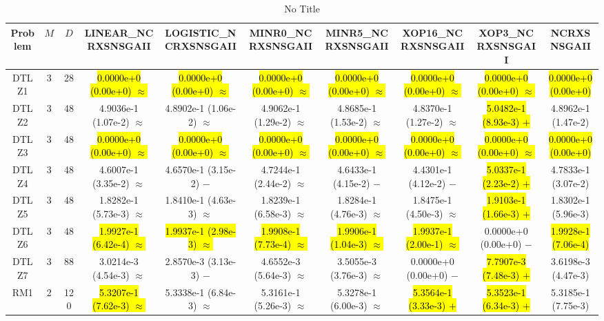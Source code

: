 \documentclass[journal]{IEEEtran}
\begin{document}
\begin{table*}[htbp]
\renewcommand{\arraystretch}{1.2}
\centering
\caption{No Title}
\begin{tabular}{cccccccccc}
\toprule
Problem&$M$&$D$&LINEAR\_NCRXSNSGAII&LOGISTIC\_NCRXSNSGAII&MINR0\_NCRXSNSGAII&MINR5\_NCRXSNSGAII&XOP16\_NCRXSNSGAII&XOP3\_NCRXSNSGAII&NCRXSNSGAII\\
\midrule
\multirow{1}{*}{DTLZ1}&3&28&\hl{0.0000e+0 (0.00e+0) $\approx$}&\hl{0.0000e+0 (0.00e+0) $\approx$}&\hl{0.0000e+0 (0.00e+0) $\approx$}&\hl{0.0000e+0 (0.00e+0) $\approx$}&\hl{0.0000e+0 (0.00e+0) $\approx$}&\hl{0.0000e+0 (0.00e+0) $\approx$}&\hl{0.0000e+0 (0.00e+0)}\\
\hline
\multirow{1}{*}{DTLZ2}&3&48&4.9036e-1 (1.07e-2) $\approx$&4.8902e-1 (1.06e-2) $\approx$&4.9062e-1 (1.29e-2) $\approx$&4.8685e-1 (1.53e-2) $\approx$&4.8370e-1 (1.27e-2) $\approx$&\hl{5.0482e-1 (8.93e-3) $+$}&4.8962e-1 (1.47e-2)\\
\hline
\multirow{1}{*}{DTLZ3}&3&48&\hl{0.0000e+0 (0.00e+0) $\approx$}&\hl{0.0000e+0 (0.00e+0) $\approx$}&\hl{0.0000e+0 (0.00e+0) $\approx$}&\hl{0.0000e+0 (0.00e+0) $\approx$}&\hl{0.0000e+0 (0.00e+0) $\approx$}&\hl{0.0000e+0 (0.00e+0) $\approx$}&\hl{0.0000e+0 (0.00e+0)}\\
\hline
\multirow{1}{*}{DTLZ4}&3&48&4.6007e-1 (3.35e-2) $\approx$&4.6570e-1 (3.15e-2) $-$&4.7244e-1 (2.44e-2) $\approx$&4.6433e-1 (4.15e-2) $-$&4.4301e-1 (4.12e-2) $-$&\hl{5.0337e-1 (2.23e-2) $+$}&4.7833e-1 (3.07e-2)\\
\hline
\multirow{1}{*}{DTLZ5}&3&48&1.8282e-1 (5.73e-3) $\approx$&1.8410e-1 (4.63e-3) $\approx$&1.8239e-1 (6.58e-3) $\approx$&1.8284e-1 (4.76e-3) $\approx$&1.8475e-1 (4.50e-3) $\approx$&\hl{1.9103e-1 (1.66e-3) $+$}&1.8302e-1 (5.96e-3)\\
\hline
\multirow{1}{*}{DTLZ6}&3&48&\hl{1.9927e-1 (6.42e-4) $\approx$}&\hl{1.9937e-1 (2.98e-3) $\approx$}&\hl{1.9908e-1 (7.73e-4) $\approx$}&\hl{1.9906e-1 (1.04e-3) $\approx$}&\hl{1.9937e-1 (2.00e-1) $\approx$}&0.0000e+0 (0.00e+0) $-$&\hl{1.9928e-1 (7.06e-4)}\\
\hline
\multirow{1}{*}{DTLZ7}&3&88&3.0214e-3 (4.54e-3) $\approx$&2.8570e-3 (3.13e-3) $-$&4.6552e-3 (5.64e-3) $\approx$&3.5055e-3 (3.76e-3) $\approx$&0.0000e+0 (0.00e+0) $-$&\hl{7.7907e-3 (7.48e-3) $+$}&3.6198e-3 (4.47e-3)\\
\hline
\multirow{1}{*}{RM1}&2&120&\hl{5.3207e-1 (7.62e-3) $\approx$}&5.3338e-1 (6.84e-3) $\approx$&5.3161e-1 (5.26e-3) $\approx$&5.3278e-1 (6.00e-3) $\approx$&\hl{5.3564e-1 (3.33e-3) $+$}&\hl{5.3523e-1 (6.34e-3) $+$}&5.3185e-1 (7.75e-3)\\

\end{tabular}
\end{table*}
\end{document}

